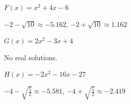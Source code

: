 \begin{exercise}
$F(x)=x^2+4x-6$
\end{exercise}

\begin{solution}
  $-2-\sqrt{10}\approx-5.162$, $-2+\sqrt{10}\approx1.162$
\end{solution}



\begin{exercise}
$G(x)=2x^2-3x+4$
\end{exercise}

\begin{solution}
     No real solutions.
\end{solution}



\begin{exercise}\label{exercise-3.3.20}
$H(x)=-2 x^2-16 x-27$
\end{exercise}

\begin{solution}
     $-4-\sqrt{\frac{5}{2}}\approx-5.581$, $-4+\sqrt{\frac{5}{2}}\approx-2.419$
\end{solution}
